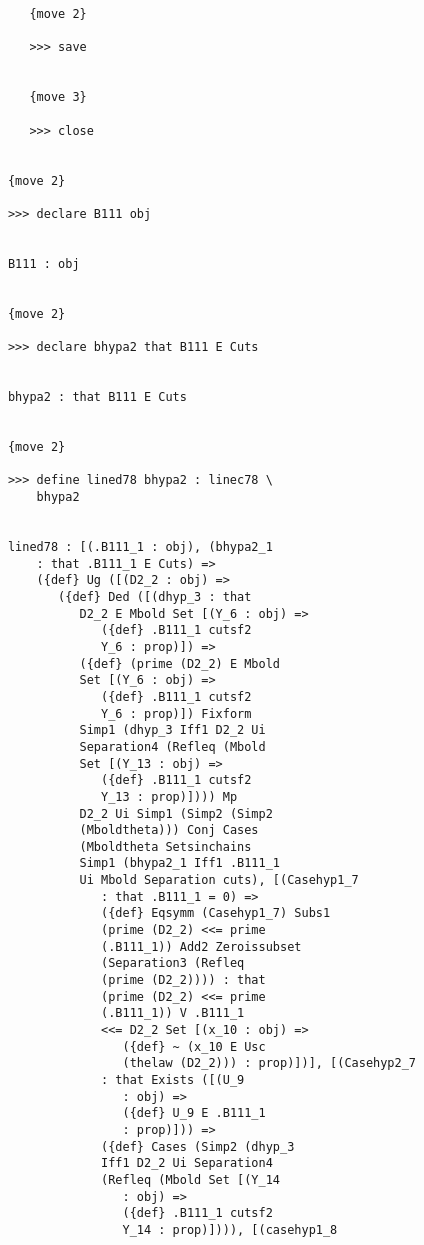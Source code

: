\documentclass[12pt]{article}
\begin{document}
\begin{verbatim}
         {move 2}

         >>> save


         {move 3}

         >>> close


      {move 2}

      >>> declare B111 obj


      B111 : obj


      {move 2}

      >>> declare bhypa2 that B111 E Cuts


      bhypa2 : that B111 E Cuts


      {move 2}

      >>> define lined78 bhypa2 : linec78 \
          bhypa2


      lined78 : [(.B111_1 : obj), (bhypa2_1 
          : that .B111_1 E Cuts) => 
          ({def} Ug ([(D2_2 : obj) => 
             ({def} Ded ([(dhyp_3 : that 
                D2_2 E Mbold Set [(Y_6 : obj) => 
                   ({def} .B111_1 cutsf2 
                   Y_6 : prop)]) => 
                ({def} (prime (D2_2) E Mbold 
                Set [(Y_6 : obj) => 
                   ({def} .B111_1 cutsf2 
                   Y_6 : prop)]) Fixform 
                Simp1 (dhyp_3 Iff1 D2_2 Ui 
                Separation4 (Refleq (Mbold 
                Set [(Y_13 : obj) => 
                   ({def} .B111_1 cutsf2 
                   Y_13 : prop)]))) Mp 
                D2_2 Ui Simp1 (Simp2 (Simp2 
                (Mboldtheta))) Conj Cases 
                (Mboldtheta Setsinchains 
                Simp1 (bhypa2_1 Iff1 .B111_1 
                Ui Mbold Separation cuts), [(Casehyp1_7 
                   : that .B111_1 = 0) => 
                   ({def} Eqsymm (Casehyp1_7) Subs1 
                   (prime (D2_2) <<= prime 
                   (.B111_1)) Add2 Zeroissubset 
                   (Separation3 (Refleq 
                   (prime (D2_2)))) : that 
                   (prime (D2_2) <<= prime 
                   (.B111_1)) V .B111_1 
                   <<= D2_2 Set [(x_10 : obj) => 
                      ({def} ~ (x_10 E Usc 
                      (thelaw (D2_2))) : prop)])], [(Casehyp2_7 
                   : that Exists ([(U_9 
                      : obj) => 
                      ({def} U_9 E .B111_1 
                      : prop)])) => 
                   ({def} Cases (Simp2 (dhyp_3 
                   Iff1 D2_2 Ui Separation4 
                   (Refleq (Mbold Set [(Y_14 
                      : obj) => 
                      ({def} .B111_1 cutsf2 
                      Y_14 : prop)]))), [(casehyp1_8 

\end{verbatim}
\end{document}
